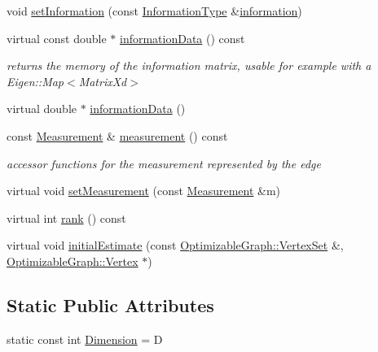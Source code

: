 \begin{DoxyCompactItemize}
\item 
void \mbox{\hyperlink{classg2o_1_1_base_edge_a9bb871a94d2413ec3113a147417f2dc4}{set\+Information}} (const \mbox{\hyperlink{classg2o_1_1_base_edge_a2e5a33343ac3f189d8a7d5ee4d8b73fc}{Information\+Type}} \&\mbox{\hyperlink{classg2o_1_1_base_edge_a405f8d52738e557a0860b52ac67a005b}{information}})
\item 
virtual const double $\ast$ \mbox{\hyperlink{classg2o_1_1_base_edge_acf02f0d69998b75b207bc102f079d5b8}{information\+Data}} () const
\begin{DoxyCompactList}\small\item\em returns the memory of the information matrix, usable for example with a Eigen\+::\+Map$<$\+Matrix\+Xd$>$ \end{DoxyCompactList}\item 
virtual double $\ast$ \mbox{\hyperlink{classg2o_1_1_base_edge_a72ae9d215d6abc892f735e3d3ab81a88}{information\+Data}} ()
\item 
const \mbox{\hyperlink{classg2o_1_1_base_edge_a2c148abba650a20b8c7eed75d3e2211e}{Measurement}} \& \mbox{\hyperlink{classg2o_1_1_base_edge_a8e890d43f491afdd035713ff176ddd5c}{measurement}} () const
\begin{DoxyCompactList}\small\item\em accessor functions for the measurement represented by the edge \end{DoxyCompactList}\item 
virtual void \mbox{\hyperlink{classg2o_1_1_base_edge_a24aae7b4fc35d311158f104cfdd95aeb}{set\+Measurement}} (const \mbox{\hyperlink{classg2o_1_1_base_edge_a2c148abba650a20b8c7eed75d3e2211e}{Measurement}} \&m)
\item 
virtual int \mbox{\hyperlink{classg2o_1_1_base_edge_a6776919120a8eaca8e4b9d0e6b8a421d}{rank}} () const
\item 
virtual void \mbox{\hyperlink{classg2o_1_1_base_edge_a0c3d9763f1dc504627df75e0f381ca70}{initial\+Estimate}} (const \mbox{\hyperlink{classg2o_1_1_hyper_graph_a703938cdb4bb636860eed55a2489d70c}{Optimizable\+Graph\+::\+Vertex\+Set}} \&, \mbox{\hyperlink{classg2o_1_1_optimizable_graph_1_1_vertex}{Optimizable\+Graph\+::\+Vertex}} $\ast$)
\end{DoxyCompactItemize}
\subsection*{Static Public Attributes}
\begin{DoxyCompactItemize}
\item 
static const int \mbox{\hyperlink{classg2o_1_1_base_edge_ab4812acb21e0b9de80dc6d676e71cb70}{Dimension}} = D
\end{DoxyCompactItemize}
